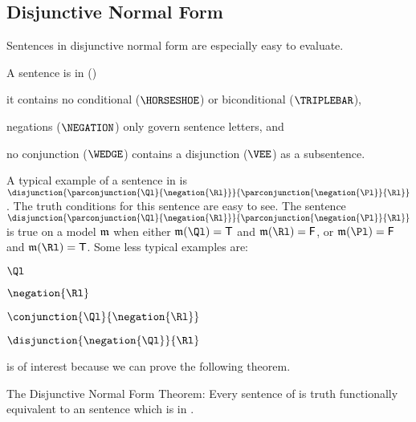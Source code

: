 \subsection{Disjunctive Normal Form}\label{Disjunctive Normal Form}

Sentences in disjunctive normal form are especially easy to evaluate.  
\begin{majorILnc}{}
A \GSL{} sentence is in  () \Iff
\begin{cenumerate}
\item it contains no conditional ($\HORSESHOE$) or biconditional ($\TRIPLEBAR$),
\item negations ($\NEGATION$) only govern sentence letters, and
\item no conjunction ($\WEDGE$) contains a disjunction ($\VEE$) as a subsentence.
\end{cenumerate}
\end{majorILnc}
\noindent{}A typical example of a sentence in  is $\disjunction{\parconjunction{\Ql}{\negation{\Rl}}}{\parconjunction{\negation{\Pl}}{\Rl}}$.  The truth conditions for this sentence are easy to see.  The sentence $\disjunction{\parconjunction{\Ql}{\negation{\Rl}}}{\parconjunction{\negation{\Pl}}{\Rl}}$ is true on a model $\mathfrak{m}$ when either $\IntA(\Ql)=\TrueB$ and $\IntA(\Rl)=\FalseB$, or $\IntA(\Pl)=\FalseB$ and $\IntA(\Rl)=\TrueB$.  Some less typical examples are:
\begin{menumerate}
\item $\Ql$
\item $\negation{\Rl}$
\item $\conjunction{\Ql}{\negation{\Rl}}$
\item $\disjunction{\negation{\Ql}}{\Rl}$
\end{menumerate}
 is of interest because we can prove the following theorem.
\begin{THEOREM}{ The Disjunctive Normal Form Theorem:}
Every sentence of \GSL{} is truth functionally equivalent to an \GSL{} sentence which is in .
\end{THEOREM}
